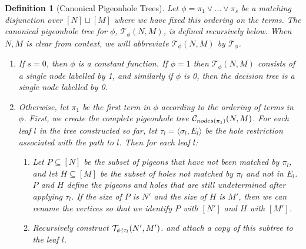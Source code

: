 \documentclass[11pt]{article}
\newtheorem{definition}{Definition}
\newcommand{\todo}[1]{\textcolor{red}{TODO: #1}}
\newcommand{\nodes}{\mathrm{nodes}}
\begin{document}
\begin{definition}[Canonical Pigeonhole Trees]
Let $\phi = \pi_1 \lor \ldots \lor \pi_{s}$ be a matching disjunction over $[N] \sqcup [M]$  where we have fixed this ordering on the terms. 
The canonical pigeonhole tree for $\phi$, 
$\mathcal{T}_{\phi}(N,M)$, is defined recursively below. When $N,M$ is clear from context, we will abbreviate $\mathcal{T}_{\phi}(N,M)$ by $\mathcal{T}_{\phi}$.

\begin{enumerate}
    \item If $s=0$, then $\phi$ is a constant function. If $\phi=1$ then $\mathcal{T}_{\phi}(N,M)$ consists of a single node labelled by 1, and similarly if $\phi$ is 0, then the decision tree is a single node labelled by 0.
    \item Otherwise, let $\pi_1$ be the first term in $\phi$ according to the ordering of terms in $\phi$. First, we create the complete pigeonhole tree ${\cal C}_{ nodes(\pi_1)}(N,M)$. For each leaf $l$ in the tree constructed so far, let $\tau_l = \langle \sigma_l,E_l \rangle$ be the hole restriction associated with the path to $l$. Then for each leaf $l$: 
    \begin{enumerate}
        \item Let $P \subseteq [N]$ be the subset of pigeons that have not been matched  by $\pi_l$, and let $H \subseteq [M]$ be the subset of holes not matched by $\pi_l$ and not in $E_l$. $P$ and $H$ define the pigeons and holes that are still undetermined after applying $\tau_l$.  If the size of $P$ is $N'$ and the size of $H$ is $M'$, then we can rename the vertices so that we identify $P$ with $[N']$ and $H$ with $[M']$.
        \item Recursively construct ${\cal T}_{\phi\upharpoonright \tau_l}(N',M')$. and attach a copy of this subtree to the leaf $l$.
    \end{enumerate}
    \end{enumerate}
\end{definition}


\end{document}
